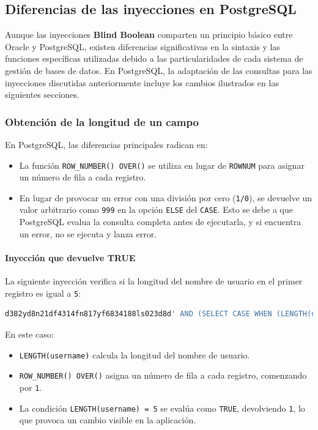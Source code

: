 \documentclass[a4paper,12pt]{article}
\begin{document}
\subsection{Diferencias de las inyecciones en PostgreSQL}

Aunque las inyecciones \textbf{Blind Boolean} comparten un principio básico entre Oracle y PostgreSQL, existen diferencias significativas en la sintaxis y las funciones específicas utilizadas debido a las particularidades de cada sistema de gestión de bases de datos. En PostgreSQL, la adaptación de las consultas para las inyecciones discutidas anteriormente incluye los cambios ilustrados en las siguientes secciones.

\subsubsection{Obtención de la longitud de un campo}

En PostgreSQL, las diferencias principales radican en:
\begin{itemize}
    \item La función \texttt{ROW\_NUMBER() OVER()} se utiliza en lugar de \texttt{ROWNUM} para asignar un número de fila a cada registro.
    \item En lugar de provocar un error con una división por cero (\texttt{1/0}), se devuelve un valor arbitrario como \texttt{999} en la opción \texttt{ELSE} del \texttt{CASE}. Esto se debe a que PostgreSQL evalua la consulta completa antes de ejecutarla, y si encuentra un error, no se ejecuta y lanza error.
\end{itemize}

\paragraph{Inyección que devuelve TRUE}
La siguiente inyección verifica si la longitud del nombre de usuario en el primer registro es igual a \texttt{5}:

\begin{lstlisting}[language=SQL]
d382yd8n21df4314fn817yf6834188ls023d8d' AND (SELECT CASE WHEN (LENGTH(username) = 5) THEN 1 ELSE 999 END FROM (SELECT username, ROW_NUMBER() OVER() AS rn FROM Usuarios) AS subquery WHERE rn=1) = 1 --
\end{lstlisting}

En este caso:
\begin{itemize}
    \item \texttt{LENGTH(username)} calcula la longitud del nombre de usuario.
    \item \texttt{ROW\_NUMBER() OVER()} asigna un número de fila a cada registro, comenzando por \texttt{1}.
    \item La condición \texttt{LENGTH(username) = 5} se evalúa como \texttt{TRUE}, devolviendo \texttt{1}, lo que provoca un cambio visible en la aplicación.
\end{itemize}
\end{document}
